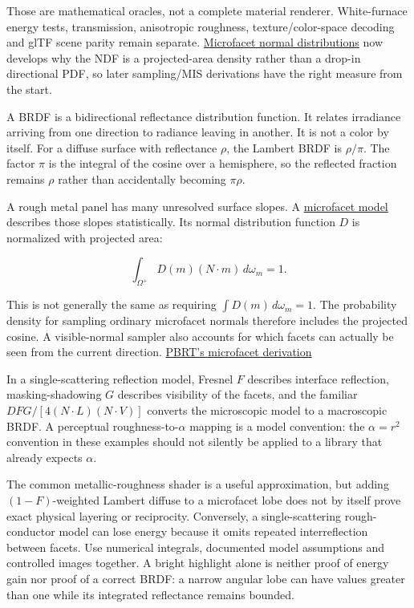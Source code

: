 Those are mathematical oracles, not a complete material renderer. White-furnace energy tests, transmission, anisotropic roughness, texture/color-space decoding and glTF scene parity remain separate. \hyperref[appendix-885c1cb64ae9]{Microfacet normal distributions} now develops why the NDF is a projected-area density rather than a drop-in directional PDF, so later sampling/MIS derivations have the right measure from the start.

A BRDF is a bidirectional reflectance distribution function. It relates irradiance arriving from one direction to radiance leaving in another. It is not a color by itself. For a diffuse surface with reflectance \(\rho\), the Lambert BRDF is \(\rho/\pi\). The factor \(\pi\) is the integral of the cosine over a hemisphere, so the reflected fraction remains \(\rho\) rather than accidentally becoming \(\pi\rho\).

A rough metal panel has many unresolved surface slopes. A \hyperref[appendix-885c1cb64ae9]{microfacet model} describes those slopes statistically. Its normal distribution function \(D\) is normalized with projected area:

\[
\int_{\Omega^+} D(m)(N\cdot m)\,d\omega_m=1.
\]

This is not generally the same as requiring \(\int D(m)\,d\omega_m=1\). The probability density for sampling ordinary microfacet normals therefore includes the projected cosine. A visible-normal sampler also accounts for which facets can actually be seen from the current direction. \href{https://pbr-book.org/4ed/Reflection_Models/Roughness_Using_Microfacet_Theory}{PBRT's microfacet derivation}

In a single-scattering reflection model, Fresnel \(F\) describes interface reflection, masking-shadowing \(G\) describes visibility of the facets, and the familiar \(DFG/[4(N\cdot L)(N\cdot V)]\) converts the microscopic model to a macroscopic BRDF. A perceptual roughness-to-\(\alpha\) mapping is a model convention: the \(\alpha=r^2\) convention in these examples should not silently be applied to a library that already expects \(\alpha\).

The common metallic-roughness shader is a useful approximation, but adding \((1-F)\)-weighted Lambert diffuse to a microfacet lobe does not by itself prove exact physical layering or reciprocity. Conversely, a single-scattering rough-conductor model can lose energy because it omits repeated interreflection between facets. Use numerical integrals, documented model assumptions and controlled images together. A bright highlight alone is neither proof of energy gain nor proof of a correct BRDF: a narrow angular lobe can have values greater than one while its integrated reflectance remains bounded.

